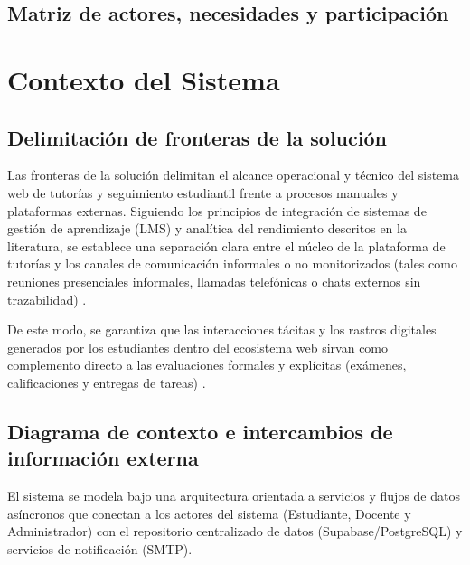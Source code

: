 \documentclass[11pt, a4paper]{article}
\begin{document}
\subsection{Matriz de actores, necesidades y participación}

\section{Contexto del Sistema}
\subsection{Delimitación de fronteras de la solución}
Las fronteras de la solución delimitan el alcance operacional y técnico del sistema web de tutorías y seguimiento estudiantil frente a procesos manuales y plataformas externas. Siguiendo los principios de integración de sistemas de gestión de aprendizaje (LMS) y analítica del rendimiento descritos en la literatura, se establece una separación clara entre el núcleo de la plataforma de tutorías y los canales de comunicación informales o no monitorizados (tales como reuniones presenciales informales, llamadas telefónicas o chats externos sin trazabilidad) \cite{popescu2018, chamoun2025, molenaar2020}. 

De este modo, se garantiza que las interacciones tácitas y los rastros digitales generados por los estudiantes dentro del ecosistema web sirvan como complemento directo a las evaluaciones formales y explícitas (exámenes, calificaciones y entregas de tareas) \cite{chamoun2025, dequincey2019, cruz2025}.

\subsection{Diagrama de contexto e intercambios de información externa}
El sistema se modela bajo una arquitectura orientada a servicios y flujos de datos asíncronos que conectan a los actores del sistema (Estudiante, Docente y Administrador) con el repositorio centralizado de datos (Supabase/PostgreSQL) y servicios de notificación (SMTP). 
\end{document}
